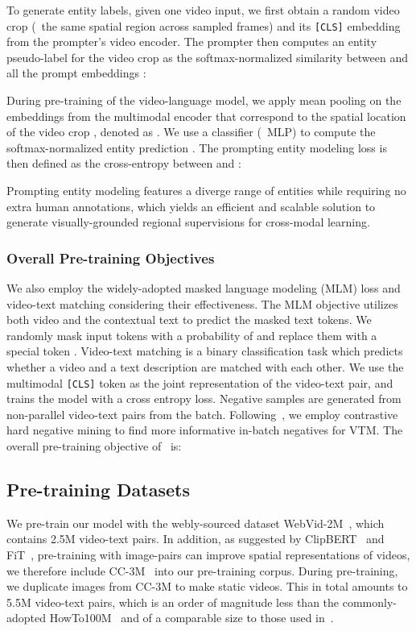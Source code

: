 \documentclass[10pt,twocolumn,letterpaper]{article}
\begin{document}
To generate entity labels, given one video input, we first obtain a random video crop  (\eg~the same spatial region across sampled frames) and its \texttt{[CLS]} embedding  from the prompter's video encoder. The prompter then computes an entity pseudo-label  for the video crop as the softmax-normalized similarity between  and all the prompt embeddings :

During pre-training of the video-language model, we apply mean pooling on the embeddings from the multimodal encoder that correspond to the spatial location of the video crop , denoted as .
We use a classifier (\eg~MLP) to compute the softmax-normalized entity prediction .
The prompting entity modeling loss is then defined as the cross-entropy between  and :

Prompting entity modeling features a diverge range of entities while requiring no extra human annotations, which yields an efficient and scalable solution to generate visually-grounded regional supervisions for cross-modal learning.
\vspace{-1em}
\subsubsection{Overall Pre-training Objectives}\label{sec:method-mlm}
\vspace{-0.5ex}
We also employ the widely-adopted masked language modeling (MLM) loss  and video-text matching  considering their effectiveness.
The MLM objective utilizes both video and the contextual text to predict the masked text tokens.
We randomly mask input tokens with a probability of  and replace them with a special token .
Video-text matching is a binary classification task which predicts whether a video and a text description are matched with each other.
We use the multimodal \texttt{[CLS]} token  as the joint representation of the video-text pair, and trains the model with a cross entropy loss.
Negative samples are generated from non-parallel video-text pairs from the batch.
Following~\cite{ALBEF}, we employ contrastive hard negative mining to find more informative in-batch negatives for VTM.
The overall pre-training objective of \name~is:

\subsection{Pre-training Datasets}\label{sec:method-ptdata}
We pre-train our model with the webly-sourced dataset WebVid-2M~\cite{Bain21}, which contains 2.5M video-text pairs.
In addition, as suggested by ClipBERT~\cite{lei2021less} and FiT~\cite{Bain21}, pre-training with image-pairs can improve spatial representations of videos, we therefore include CC-3M~\cite{2018cc3m} into our pre-training corpus.
During pre-training, we duplicate images from CC-3M to make static videos.
This in total amounts to 5.5M video-text pairs, which is an order of magnitude less than the commonly-adopted HowTo100M~\cite{miech2020end,li2020hero,zhu2020actbert} and of a comparable size to those used in~\cite{lei2021less,Bain21}.
\end{document}
